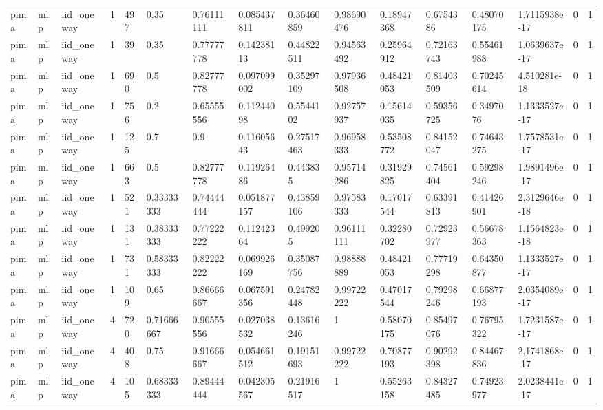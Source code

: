 \begin{tabular}{llllllllllllllll}
pima & mlp & iid\_oneway & 1 & 497 & 0.35 & 0.76111111 & 0.085437811 & 0.36460859 & 0.98690476 & 0.18947368 & 0.6754386 & 0.48070175 & 1.7115938e-17 & 0 & 1 \\
pima & mlp & iid\_oneway & 1 & 39 & 0.35 & 0.77777778 & 0.14238113 & 0.44822511 & 0.94563492 & 0.25964912 & 0.72163743 & 0.55461988 & 1.0639637e-17 & 0 & 1 \\
pima & mlp & iid\_oneway & 1 & 690 & 0.5 & 0.82777778 & 0.097099002 & 0.35297109 & 0.97936508 & 0.48421053 & 0.81403509 & 0.70245614 & 4.510281e-18 & 0 & 1 \\
pima & mlp & iid\_oneway & 1 & 756 & 0.2 & 0.65555556 & 0.11244098 & 0.5544102 & 0.92757937 & 0.15614035 & 0.59356725 & 0.3497076 & 1.1333527e-17 & 0 & 1 \\
pima & mlp & iid\_oneway & 1 & 125 & 0.7 & 0.9 & 0.11605643 & 0.27517463 & 0.96958333 & 0.53508772 & 0.84152047 & 0.74643275 & 1.7578531e-17 & 0 & 1 \\
pima & mlp & iid\_oneway & 1 & 663 & 0.5 & 0.82777778 & 0.11926486 & 0.443835 & 0.95714286 & 0.31929825 & 0.74561404 & 0.59298246 & 1.9891496e-17 & 0 & 1 \\
pima & mlp & iid\_oneway & 1 & 521 & 0.33333333 & 0.74444444 & 0.051877157 & 0.43859106 & 0.97583333 & 0.17017544 & 0.63391813 & 0.41426901 & 2.3129646e-18 & 0 & 1 \\
pima & mlp & iid\_oneway & 1 & 131 & 0.38333333 & 0.77222222 & 0.11242364 & 0.499205 & 0.96111111 & 0.32280702 & 0.72923977 & 0.56678363 & 1.1564823e-18 & 0 & 1 \\
pima & mlp & iid\_oneway & 1 & 731 & 0.58333333 & 0.82222222 & 0.069926169 & 0.35087756 & 0.98888889 & 0.48421053 & 0.77719298 & 0.64350877 & 1.1333527e-17 & 0 & 1 \\
pima & mlp & iid\_oneway & 1 & 109 & 0.65 & 0.86666667 & 0.067591356 & 0.24782448 & 0.99722222 & 0.47017544 & 0.79298246 & 0.66877193 & 2.0354089e-17 & 0 & 1 \\
pima & mlp & iid\_oneway & 4 & 720 & 0.71666667 & 0.90555556 & 0.027038532 & 0.13616246 & 1 & 0.58070175 & 0.85497076 & 0.76795322 & 1.7231587e-17 & 0 & 1 \\
pima & mlp & iid\_oneway & 4 & 408 & 0.75 & 0.91666667 & 0.054661512 & 0.19151693 & 0.99722222 & 0.70877193 & 0.90292398 & 0.84467836 & 2.1741868e-17 & 0 & 1 \\
pima & mlp & iid\_oneway & 4 & 105 & 0.68333333 & 0.89444444 & 0.042305567 & 0.21916517 & 1 & 0.55263158 & 0.84327485 & 0.74923977 & 2.0238441e-17 & 0 & 1 \\

\end{tabular}
